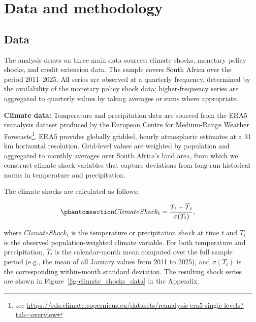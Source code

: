 \documentclass[
  letterpaper,
  DIV=11,
  numbers=noendperiod]{scrartcl}
\let\oldsection\section
\renewcommand\section{\oldsection}
\begin{document}
\section{Data and methodology}\label{data-and-methodology}

\subsection{Data}\label{data}

The analysis draws on three main data sources: climate shocks, monetary
policy shocks, and credit extension data. The sample covers South Africa
over the period 2011--2025. All series are observed at a quarterly
frequency, determined by the availability of the monetary policy shock
data; higher-frequency series are aggregated to quarterly values by
taking averages or sums where appropriate.

\textbf{Climate data:} Temperature and precipitation data are sourced
from the ERA5 reanalysis dataset produced by the European Centre for
Medium-Range Weather Forecasts\footnote{see
  \url{https://cds.climate.copernicus.eu/datasets/reanalysis-era5-single-levels?tab=overview}}.
ERA5 provides globally gridded, hourly atmospheric estimates at a 31 km
horizontal resolution. Grid-level values are weighted by population and
aggregated to monthly averages over South Africa's land area, from which
we construct climate shock variables that capture deviations from
long-run historical norms in temperature and precipitation.

The climate shocks are calculated as follows:

\begin{equation}\phantomsection\label{eq-weather_shock}{ ClimateShock_{t} =  \dfrac{T_{t} -\overline{T}_{t} }{\sigma(T_{t})}, }\end{equation}

where \(ClimateShock_{t}\) is the temperature or precipitation shock at
time \(t\) and \(T_{t}\) is the observed population-weighted climate
variable. For both temperature and precipitation, \(\overline{T}_{t}\)
is the calendar-month mean computed over the full sample period (e.g.,
the mean of all January values from 2011 to 2025), and \(\sigma(T_{t})\)
is the corresponding within-month standard deviation. The resulting
shock series are shown in Figure~\ref{fig-climate_shocks_data} in the
Appendix.
\end{document}
